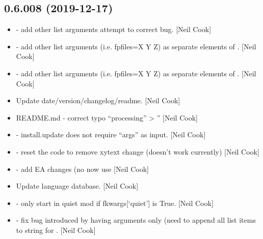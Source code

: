 \documentclass[a4paper,10pt,english]{report}
\begin{document}
\subsection{0.6.008 (2019-12-17)}
\label{\detokenize{misc/changelog:id11}}\begin{itemize}
\item {} 
 - add other list arguments \textendash{} attempt to
correct bug. {[}Neil Cook{]}

\item {} 
 - add other list arguments (i.e. \textendash{}fpfiles=X Y
Z) as separate elements of . {[}Neil Cook{]}

\item {} 
 - add other list arguments (i.e. \textendash{}fpfiles=X Y
Z) as separate elements of . {[}Neil Cook{]}

\item {} 
Update date/version/changelog/readme. {[}Neil Cook{]}

\item {} 
README.md - correct typo “processing” \textendash{}\textgreater{} ” {[}Neil
Cook{]}

\item {} 
 - install.update does not require “args” as input.
{[}Neil Cook{]}

\item {} 
 - reset the code to remove xytext change (doesn’t work
currently) {[}Neil Cook{]}

\item {} 
 - add EA changes (no  now use
 {[}Neil Cook{]}

\item {} 
Update language database. {[}Neil Cook{]}

\item {} 
 - only start in quiet mod if fkwargs{[}‘quiet’{]}
is True. {[}Neil Cook{]}

\item {} 
 - fix bug introduced by having \textendash{}arguments
only (need to append all list items to string for .
{[}Neil Cook{]}


\end{itemize}
\end{document}
